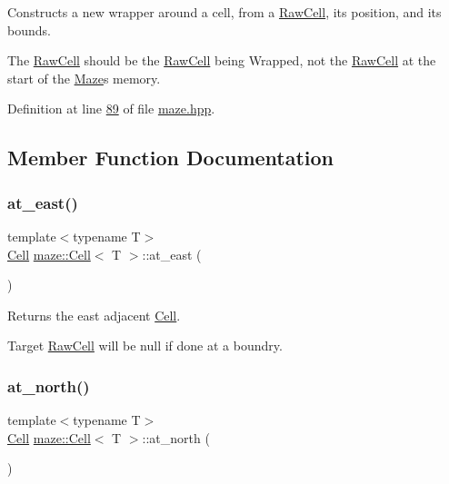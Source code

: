 Constructs a new wrapper around a cell, from a \hyperlink{classmaze_1_1RawCell}{Raw\+Cell}, its position, and its bounds. 

The \hyperlink{classmaze_1_1RawCell}{Raw\+Cell} should be the \hyperlink{classmaze_1_1RawCell}{Raw\+Cell} being Wrapped, not the \hyperlink{classmaze_1_1RawCell}{Raw\+Cell} at the start of the \hyperlink{classmaze_1_1Maze}{Maze}\textquotesingle{}s memory. 

Definition at line \hyperlink{maze_8hpp_source_l00089}{89} of file \hyperlink{maze_8hpp_source}{maze.\+hpp}.



\subsection{Member Function Documentation}
\mbox{\label{classmaze_1_1Cell_a4445101be1c13235cc8fe3a6b247cce2}} 
\subsubsection{\texorpdfstring{at\+\_\+east()}{at\_east()}}
{\footnotesize\ttfamily template$<$typename T$>$ \\
\hyperlink{classmaze_1_1Cell}{Cell} \hyperlink{classmaze_1_1Cell}{maze\+::\+Cell}$<$ T $>$\+::at\+\_\+east (\begin{DoxyParamCaption}{ }\end{DoxyParamCaption})}



Returns the east adjacent \hyperlink{classmaze_1_1Cell}{Cell}. 

Target \hyperlink{classmaze_1_1RawCell}{Raw\+Cell} will be null if done at a boundry. \mbox{\label{classmaze_1_1Cell_ac157da293a04b48cfb0503ecb7697e16}} 
\subsubsection{\texorpdfstring{at\+\_\+north()}{at\_north()}}
{\footnotesize\ttfamily template$<$typename T$>$ \\
\hyperlink{classmaze_1_1Cell}{Cell} \hyperlink{classmaze_1_1Cell}{maze\+::\+Cell}$<$ T $>$\+::at\+\_\+north (\begin{DoxyParamCaption}{ }\end{DoxyParamCaption})}



